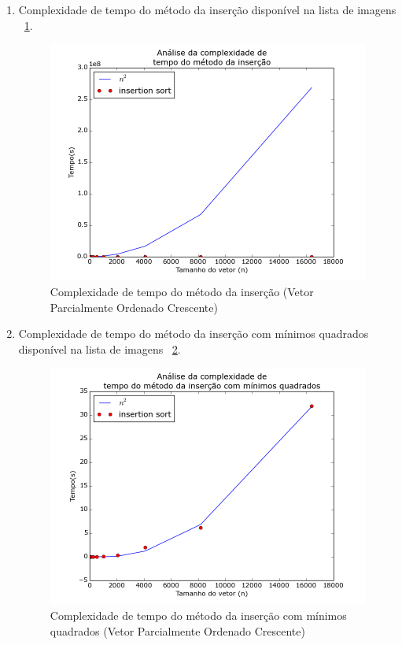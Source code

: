 \documentclass[12pt,a4paper,twoside]{report}
\begin{document}
\begin{enumerate}
\begin{enumerate}
								\item Complexidade de tempo do método da inserção disponível na lista de imagens ~\ref{fig:InsertionPlot2POC}.
								\begin{figure}[!h]
									\centering
									\includegraphics[scale=0.6]{../imagens/Insertion/insertion_plot_2_parcialmente_ordenado_crescente.png}
									\caption{Complexidade de tempo do método da inserção (Vetor Parcialmente Ordenado Crescente) \label{fig:InsertionPlot2POC}}
								\end{figure}


								\item Complexidade de tempo do método da inserção com mínimos quadrados disponível na lista de imagens  ~\ref{fig:InsertionPlot3POC}.
								\begin{figure}[!h]
									\centering
									\includegraphics[scale=0.6]{../imagens/Insertion/insertion_plot_3_parcialmente_ordenado_crescente.png}
									\caption{Complexidade de tempo do método da inserção com mínimos quadrados (Vetor Parcialmente Ordenado Crescente) \label{fig:InsertionPlot3POC}}
								\end{figure}


\end{enumerate}
\end{enumerate}
\end{document}
